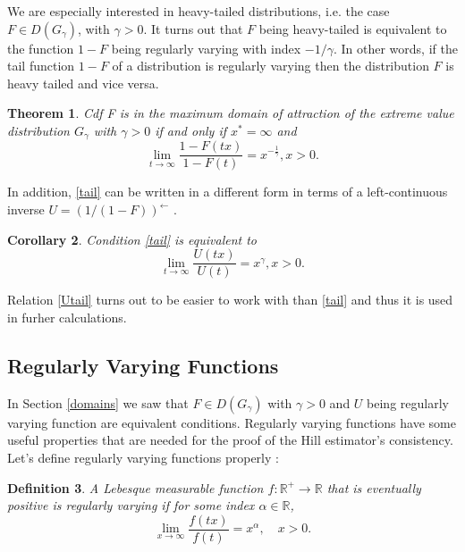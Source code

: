 \documentclass[english,12pt,a4paper,pdftex,sci,utf8]{aaltothesis} %
\newtheorem{theorem}{Theorem}[section]
\newtheorem{corollary}[theorem]{Corollary}
\newtheorem{definition}[theorem]{Definition}
\begin{document}
We are especially interested in heavy-tailed distributions, i.e. the case $F \in D(G_{\gamma})$, with $\gamma>0$. It turns out that $F$ being heavy-tailed is equivalent to the function $1-F$ being regularly varying with index $-1/ \gamma$. In other words, if the tail function $1-F$ of a distribution is regularly varying then the distribution $F$ is heavy tailed and vice versa. \cite{deHaan}

\begin{theorem}
Cdf F is in the maximum domain of attraction of the extreme value distribution $G_{\gamma}$ with $\gamma>0$ if and only if $x^*=\infty$ and
\begin{equation}
\lim_{t\rightarrow \infty} \frac{1-F(tx)}{1-F(t)} = x^{-\frac{1}{\gamma}}, x>0.
\label{tail}
\end{equation}
\end{theorem}

In addition, \eqref{tail} can be written in a different form in terms of a left-continuous inverse $U=(1/(1-F))^{\leftarrow}$ \cite{deHaan}.

\begin{corollary}
Condition \eqref{tail} is equivalent to
\begin{equation}
\lim_{t \rightarrow \infty} \frac{U(tx)}{U(t)} = x^{\gamma}, x>0.
\label{Utail}
\end{equation}
\end{corollary}

Relation \eqref{Utail} turns out to be easier to work with than \eqref{tail} and thus it is used in furher calculations.


\subsection{Regularly Varying Functions}

In Section \ref{domains} we saw that $F \in D(G_{\gamma})$ with $\gamma>0$ and $U$ being regularly varying function are equivalent conditions. Regularly varying functions have some useful properties that are needed for the proof of the Hill estimator's consistency. Let's define regularly varying functions properly \cite{deHaan}:
\begin{definition}
A Lebesque measurable function $f: \mathbb{R}^{+} \rightarrow \mathbb{R}$ that is eventually positive is regularly varying if for some index $\alpha \in \mathbb{R}$,
\begin{equation}
\lim_{x \rightarrow \infty} \frac{f(tx)}{f(t)} = x^{\alpha}, \quad x>0.
\label{regular}
\end{equation}
\label{regularDef}
\end{definition}
\end{document}
